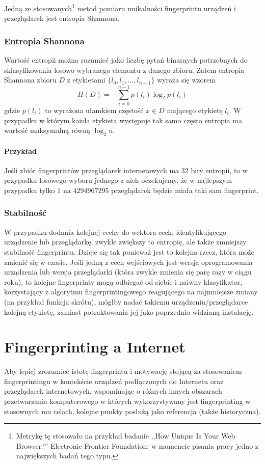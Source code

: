 Jedną ze stosowanych\footnote{Metrykę tę stosowało na przykład badanie ,,How
	Unique Is Your Web Browser?'' Electronic Frontier Foundation; w momencie
pisania pracy jedno z największych badań tego typu.} metod pomiaru unikalności
fingerprintu urządzeń i przeglądarek jest entropia Shannona.

\subsubsection{Entropia Shannona}
Wartość entropii można rozumieć jako liczbę pytań binarnych potrzebnych do
sklasyfikowania losowo wybranego elementu z danego zbioru. Zatem entropia
Shannona zbioru \(D\) z etykietami \(\{l_{0}, l_{1}, \dots, l_{n - 1}\}\) wyraża
się wzorem \[H(D) = -{\sum_{i = 0}^{n - 1}{p(l_{i})\log_{2}{p(l_{i})}}}\] gdzie
\(p(l_{i})\) to wyrażona ułamkiem częstość \(x \in D\) mającego etykietę
\(l_{i}\). W przypadku w którym każda etykieta występuje tak samo często
entropia ma wartość maksymalną równą \(\log_{2}{n}\).

\paragraph{Przykład}
Jeśli zbiór fingerprintów przeglądarek internetowych ma \(32\) bity entropii, to
w przypadku losowego wyboru jednego z nich oczekujemy, że w najlepszym przypadku
tylko \(1\) na \(4294967295\) przeglądarek będzie miała taki sam fingerprint.

\pagebreak

\subsubsection{Stabilność}
W przypadku dodania kolejnej cechy do wektora cech, identyfikującego urządzenie
lub przeglądarkę, zwykle zwiększy to entropię, ale także zmniejszy stabilność
fingerprintu. Dzieje się tak ponieważ jest to kolejna rzecz, która może zmienić
się w czasie. Jeśli jedną z cech wejściowych jest wersja oprogramowania
urządzenia lub wersja przeglądarki (która zwykle zmienia się parę razy w ciągu
roku), to kolejne fingerprinty mogą odbiegać od siebie i naiwny klasyfikator,
korzystający z algorytmu fingerprintingowego reagującego na najmniejsze zmiany
(na przykład funkcja skrótu), mógłby nadać takiemu urządzeniu/przeglądarce
kolejną etykietę, zamiast potraktowania jej jako poprzednio widzianą instalację.

\section{Fingerprinting a Internet} %
Aby lepiej zrozumieć istotę fingerprintu i motywację stojącą za stosowaniem
fingerprintingu w kontekście urządzeń podłączonych do Internetu oraz
przeglądarek internetowych, wspominając o różnych innych obszarach przetwarzania
komputerowego w których wykorzystywany jest fingerprinting w stosownych mu
celach, kolejne punkty posłużą jako referencja (także historyczna).

